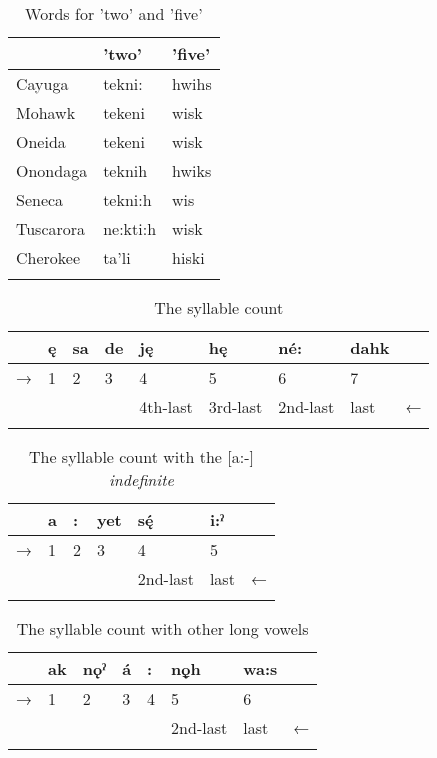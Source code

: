 

\begin{table}
\caption{Words for 'two' and 'five'}
\label{tab:1:twofive}
\begin{tabularx}{\textwidth}{XXX} 
\lsptoprule
& {}'two' & {}'five'\\
\midrule
Cayuga & tekni: & hwihs\\
Mohawk & tekeni & wisk\\
Oneida & tekeni & wisk\\
Onondaga & teknih & hwiks\\
Seneca & tekni:h & wis\\
Tuscarora & ne:kti:h & wisk\\
Cherokee & ta’li & hiski\\
\lspbottomrule
\end{tabularx}
\end{table}


\begin{table}
\caption{The syllable count}
\label{tab:1:syllcount}
\begin{tabularx}{\textwidth}{XXXXXXXXX} 
\lsptoprule
& ę & sa & de & ję & hę & né: & dahk & \\
\midrule

 → & 1 & 2 & 3 & 4 & 5 & 6 & 7 & \\
&  &  &  & 4th-last & 3rd-last & 2nd-last & last & ←\\
\lspbottomrule
\end{tabularx}
\end{table}


\begin{table}
\caption{The syllable count with the [a:-] \textit{indefinite}  }
\label{tab:1:syllindef}
\begin{tabularx}{\textwidth}{XXXXXXX} 
\lsptoprule
& a & : & yet & s\'{ę} & i:ˀ & \\
\midrule

 → & 1 & 2 & 3 & 4 & 5 & \\
&  &  &  & 2nd-last & last & ←\\
\lspbottomrule
\end{tabularx}
\end{table}


\begin{table}
\caption{The syllable count with other long vowels}
\label{tab:1:longvsyll}
\begin{tabularx}{\textwidth}{XXXXXXXX}
\lsptoprule
& ak & nǫˀ & á & : & nǫ̱h & wa:s & \\
\midrule
 → & 1 & 2 & 3 & 4 & 5 & 6 & \\
&  &  &  &  & 2nd-last & last & ←\\
\lspbottomrule
\end{tabularx}
\end{table}


